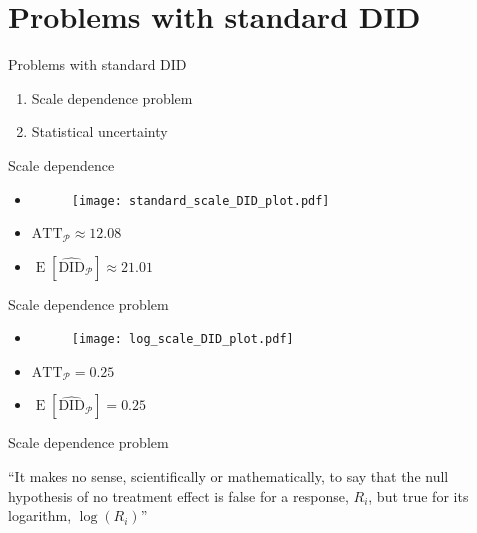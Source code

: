 \documentclass[table, xcolor={dvipsnames}, 9pt]{beamer}
\theoremstyle{newstyle}
\DeclareMathOperator{\E}{\mathrm{E}}
\begin{document}
\section{Problems with standard DID}
\begin{frame}{Problems with standard DID}
\begin{enumerate}
\item Scale dependence problem
\item \pause Statistical uncertainty
\end{enumerate}
\end{frame}
\begin{frame}{Scale dependence}
\begin{itemize}
\item[]	
\begin{figure}[H]
\texttt{[image: standard\_scale\_DID\_plot.pdf]}
\end{figure}
\item $\text{ATT}_{\mathcal{P}} \approx 12.08$
\item $\E\left[\widehat{\text{DID}}_{\mathcal{P}}\right] \approx 21.01$	
\end{itemize}
\end{frame}
\begin{frame}{Scale dependence problem}
\begin{itemize}
\item[]	
\begin{figure}[H]
\texttt{[image: log\_scale\_DID\_plot.pdf]}
\end{figure}
\item $\text{ATT}_{\mathcal{P}} = 0.25$
\item $\E\left[\widehat{\text{DID}}_{\mathcal{P}}\right] = 0.25$	
\end{itemize}
\end{frame}
\begin{frame}{Scale dependence problem}
\begin{center}
``It makes no sense, scientifically or mathematically, to say that the null hypothesis of no treatment effect is false for a response, $R_i$, but true for its logarithm, $\log\left(R_i\right)$'' \citep{rosenbaum2017}
\end{center}
\end{frame}
\end{document}
